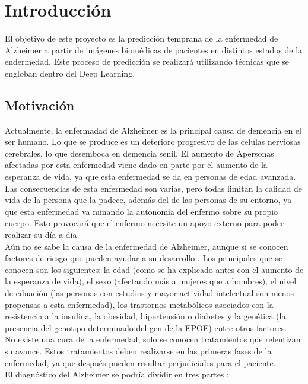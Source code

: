 \chapter{Introducción}

El objetivo de este proyecto es la predicción temprana de la enfermedad de Alzheimer a partir de imágenes biomédicas de pacientes en distintos estados de la endermedad. Este proceso de predicción se realizará utilizando técnicas que se engloban dentro del Deep Learning.

\section{Motivación}

Actualmente, la enfermadad de Alzheimer es la principal causa de demencia en el ser humano. Lo que se produce es un deterioro progresivo de las celulas nerviosas cerebrales, lo que desemboca en demencia senil. El aumento de Apersonas afectadas por esta enfermedad viene dado en parte por el aumento de la esperanza de vida, ya que esta enfermedad se da en personas de edad avanzada. Las consecuencias de esta enfermedad son varias, pero todas limitan la calidad de vida de la persona que la padece, además del de las personas de su entorno, ya que esta enfermedad va minando la autonomía del enfermo sobre su propio cuerpo. Esto provocará que el enfermo necesite un apoyo externo para poder realizar su día a día.\\
Aún no se sabe la causa de la enfermedad de Alzheimer, aunque si se conocen factores de riesgo que pueden ayudar a su desarrollo \cite{RiskFactors}. Los principales que se conocen son los siguientes: la edad (como se ha explicado antes con el aumento de la esperanza de vida), el sexo (afectando más a mujeres que a hombres), el nivel de eduación (las personas con estudios y mayor actividad intelectual son menos propensas a esta enfermedad), los trastornos metabólicos asociados con la resistencia a la insulina, la obesidad, hipertensión o diabetes y la genética (la presencia del genotipo determinado del gen de la EPOE) entre otros factores.\\
No existe una cura de la enfermedad, solo se conocen tratamientos que relentizan su avance. Estos tratamientos deben realizarse en las primeras fases de la enfermedad, ya que después pueden resultar perjudiciales para el paciente.\\
El diagnóstico del Alzheimer se podría dividir en tres partes \cite{Diagnostico}:
